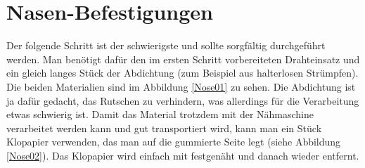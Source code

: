 \documentclass[12pt,parskip=full]{scrartcl}
\begin{document}
\section{Nasen-Befestigungen}
Der folgende Schritt ist der schwierigste und sollte sorgfältig durchgeführt werden. Man benötigt dafür den im ersten Schritt vorbereiteten Drahteinsatz und ein gleich langes Stück der Abdichtung (zum Beispiel aus halterlosen Strümpfen). Die beiden Materialien sind im Abbildung \ref{Nose01} zu sehen. Die Abdichtung ist ja dafür gedacht, das Rutschen zu verhindern, was allerdings für die Verarbeitung etwas schwierig ist. Damit das Material trotzdem mit der Nähmaschine verarbeitet werden kann und gut transportiert wird, kann man ein Stück Klopapier verwenden, das man auf die gummierte Seite legt (siehe Abbildung \ref{Nose02}). Das Klopapier wird einfach mit festgenäht und danach wieder entfernt.
\end{document}
